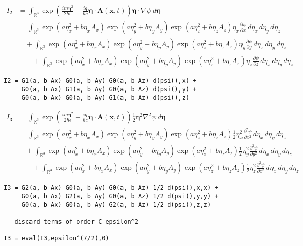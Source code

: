 \begin{align*}
I_2&=\int_{\mathbb R^3}
\exp\left(\frac{im\boldsymbol\eta^2}{2\hbar\epsilon}
-\frac{iq}{\hbar c}\boldsymbol\eta\cdot\mathbf A(\mathbf x,t)\right)
\boldsymbol\eta\cdot\nabla\psi
\,d\boldsymbol\eta
\\
&=\int_{\mathbb R^3}
\exp\left(a\eta_x^2+b\eta_xA_x\right)
\exp\left(a\eta_y^2+b\eta_yA_y\right)
\exp\left(a\eta_z^2+b\eta_zA_z\right)\eta_x\frac{\partial\psi}{\partial x}
\,d\eta_x\,d\eta_y\,d\eta_z
\\
&\quad{}+\int_{\mathbb R^3}
\exp\left(a\eta_x^2+b\eta_xA_x\right)
\exp\left(a\eta_y^2+b\eta_yA_y\right)
\exp\left(a\eta_z^2+b\eta_zA_z\right)\eta_y\frac{\partial\psi}{\partial y}
\,d\eta_x\,d\eta_y\,d\eta_z
\\
&\quad\quad{}+\int_{\mathbb R^3}
\exp\left(a\eta_x^2+b\eta_xA_x\right)
\exp\left(a\eta_y^2+b\eta_yA_y\right)
\exp\left(a\eta_z^2+b\eta_zA_z\right)\eta_z\frac{\partial\psi}{\partial z}
\,d\eta_x\,d\eta_y\,d\eta_z
\end{align*}

{\footnotesize\begin{verbatim}
I2 = G1(a, b Ax) G0(a, b Ay) G0(a, b Az) d(psi(),x) +
     G0(a, b Ax) G1(a, b Ay) G0(a, b Az) d(psi(),y) +
     G0(a, b Ax) G0(a, b Ay) G1(a, b Az) d(psi(),z)
\end{verbatim}}%

\begin{align*}
I_3&=\int_{\mathbb R^3}
\exp\left(\frac{im\boldsymbol\eta^2}{2\hbar\epsilon}
-\frac{iq}{\hbar c}\boldsymbol\eta\cdot\mathbf A(\mathbf x,t)\right)
\tfrac{1}{2}\boldsymbol\eta^2\nabla^2\psi
\,d\boldsymbol\eta
\\
&=\int_{\mathbb R^3}
\exp\left(a\eta_x^2+b\eta_xA_x\right)
\exp\left(a\eta_y^2+b\eta_yA_y\right)
\exp\left(a\eta_z^2+b\eta_zA_z\right)
\tfrac{1}{2}\eta_x^2\frac{\partial^2\psi}{\partial x^2}
\,d\eta_x\,d\eta_y\,d\eta_z
\\
&\quad{}+\int_{\mathbb R^3}
\exp\left(a\eta_x^2+b\eta_xA_x\right)
\exp\left(a\eta_y^2+b\eta_yA_y\right)
\exp\left(a\eta_z^2+b\eta_zA_z\right)
\tfrac{1}{2}\eta_y^2\frac{\partial^2\psi}{\partial y^2}
\,d\eta_x\,d\eta_y\,d\eta_z
\\
&\quad\quad{}+\int_{\mathbb R^3}
\exp\left(a\eta_x^2+b\eta_xA_x\right)
\exp\left(a\eta_y^2+b\eta_yA_y\right)
\exp\left(a\eta_z^2+b\eta_zA_z\right)
\tfrac{1}{2}\eta_z^2\frac{\partial^2\psi}{\partial z^2}
\,d\eta_x\,d\eta_y\,d\eta_z
\end{align*}

{\footnotesize\begin{verbatim}
I3 = G2(a, b Ax) G0(a, b Ay) G0(a, b Az) 1/2 d(psi(),x,x) +
     G0(a, b Ax) G2(a, b Ay) G0(a, b Az) 1/2 d(psi(),y,y) +
     G0(a, b Ax) G0(a, b Ay) G2(a, b Az) 1/2 d(psi(),z,z)

-- discard terms of order C epsilon^2

I3 = eval(I3,epsilon^(7/2),0)
\end{verbatim}}%


